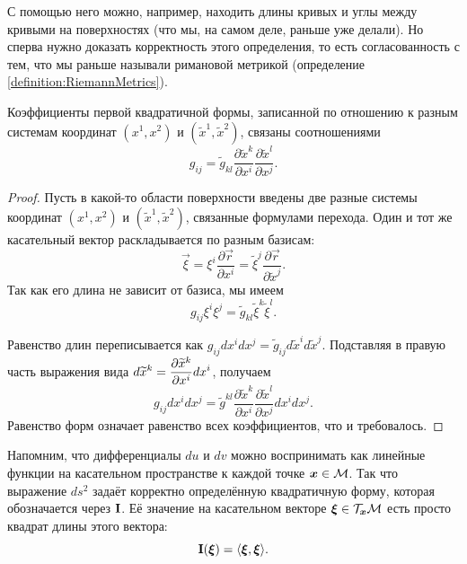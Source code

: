 С помощью него можно, например, находить длины кривых и углы между кривыми на поверхностях (что мы, на самом деле, раньше уже делали). Но сперва нужно доказать корректность этого определения, то есть согласованность с тем, что мы раньше называли римановой метрикой (определение \ref{definition:RiemannMetrics}).

\begin{proposition}
	Коэффициенты первой квадратичной формы, записанной по отношению к разным системам координат $(x^1, x^2)$ и $(\widetilde{x}^1, \widetilde{x}^2)$, связаны соотношениями\footnotemark
	\begin{equation} \label{eq:QTensorLaw}
		g_{ij} = \widetilde{g}_{kl}\frac{\partial\widetilde{x}^k}{\partial x^i}\frac{\partial \widetilde{x}^l}{\partial x^j}.
	\end{equation}
\end{proposition}


\begin{proof}
	Пусть в какой-то области поверхности введены две разные системы координат $(x^1, x^2)$ и $(\widetilde{x}^1, \widetilde{x}^2)$, связанные формулами перехода. Один и тот же касательный вектор раскладывается по разным базисам:
	\[
		\vec{\xi} = \xi^i\frac{\partial\vec{r}}{\partial x^i} = \widetilde{\xi}^j\frac{\partial\vec{r}}{\partial\widetilde{x}^j}.
	\]
	Так как его длина не зависит от базиса, мы имеем
	\[
		g_{ij}\xi^i\xi^j = \widetilde{g}_{kl}\widetilde{\xi}^k\widetilde{\xi}^l.
	\]

	Равенство длин переписывается как $g_{ij}dx^idx^j = \widetilde{g}_{ij}d\widetilde{x}^id\widetilde{x}^j$. Подставляя в правую часть выражения вида $\displaystyle d\widetilde{x}^k = \frac{\partial\widetilde{x}^k}{\partial x^i}dx^i$, получаем
	\[
		g_{ij}dx^idx^j = \widetilde{g}^{kl}\frac{\partial\widetilde{x}^k}{\partial x^i}\frac{\partial\widetilde{x}^l}{\partial x^j}dx^idx^j.
	\]
	Равенство форм означает равенство всех коэффициентов, что и требовалось.
\end{proof}

Напомним, что дифференциалы $du$ и $dv$ можно воспринимать как линейные функции на касательном пространстве к каждой точке $\boldsymbol{x} \in \mathcal{M}$. Так что выражение $ds^2$ задаёт корректно определённую квадратичную форму, которая обозначается через $\boldsymbol{\operatorname{I}}$. Её значение на касательном векторе $\boldsymbol{\xi} \in \mathcal{T}_{\boldsymbol{x}}\mathcal{M}$ есть просто квадрат длины этого вектора:
\[
	\boldsymbol{\operatorname{I}}(\boldsymbol{\xi}) = \langle\boldsymbol{\xi}, \boldsymbol{\xi}\rangle.
\]

